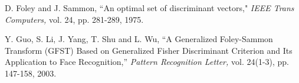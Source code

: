 \documentclass{report}
\begin{document}
\begin{thebibliography}{1}%

D. Foley and J. Sammon, ``An optimal set of discriminant vectors,"
\emph{IEEE Trans Computers,} vol. 24, pp. 281-289, 1975.

Y. Guo, S. Li,  J. Yang, T. Shu and L. Wu, ``A Generalized
Foley-Sammon Transform (GFST) Based on Generalized Fisher
Discriminant Criterion and Its Application to Face Recognition,''
\emph{Pattern Recognition Letter,} vol. 24(1-3), pp. 147-158,
2003.

\end{thebibliography}
\end{document}
